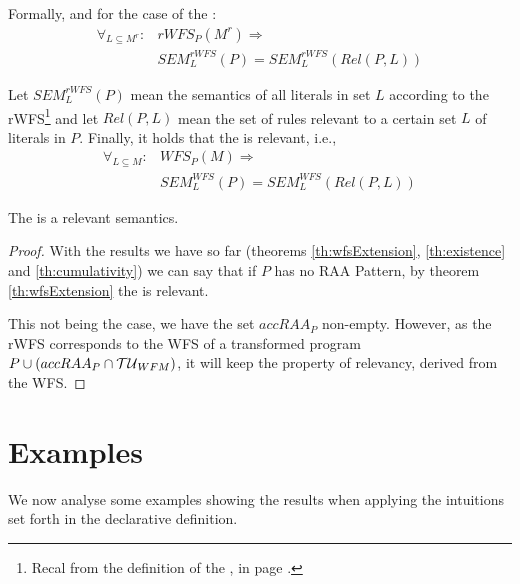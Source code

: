 Formally, and for the case of the \rwfs:
\begin{align*}
\forall_{L\subseteq M^{r}}:	& rWFS_{P}(M^{r})\Rightarrow\\
												& SEM_{L}^{rWFS}(P) = SEM_{L}^{rWFS}(Rel(P,L))
\end{align*}

\begin{theorem}
Let $SEM_{L}^{rWFS}(P)$ mean the semantics of all literals in set $L$ according to the rWFS\footnote{Recal from the definition of the \RWFS, in page \pageref{def:rwfs}.} and let $Rel(P,L)$ mean the set of rules relevant to a certain set $L$ of literals in $P$. Finally, it holds that the \WFS is relevant, i.e., 
\begin{align*}
\forall_{L\subseteq M}:	& WFS_{P}(M)\Rightarrow\\
												& SEM_{L}^{WFS}(P) = SEM_{L}^{WFS}(Rel(P,L))
\end{align*}

The \rwfs is a relevant semantics.

\begin{proof}
With the results we have so far (theorems \ref{th:wfsExtension}, \ref{th:existence} and \ref{th:cumulativity}) we can say that if $P$ has no RAA Pattern, by theorem \ref{th:wfsExtension} the \rwfs is relevant.

This not being the case, we have the set $accRAA_{P}$ non-empty. However, as the rWFS corresponds to the WFS of a transformed program $P\cup\left(accRAA_{P}\cap {\cal{TU}}_{WFM}\right)$, it will keep the property of relevancy, derived from the WFS.	
\end{proof}
\end{theorem}







\section{Examples}
We now analyse some examples showing the results when applying the intuitions set forth in the declarative definition.



